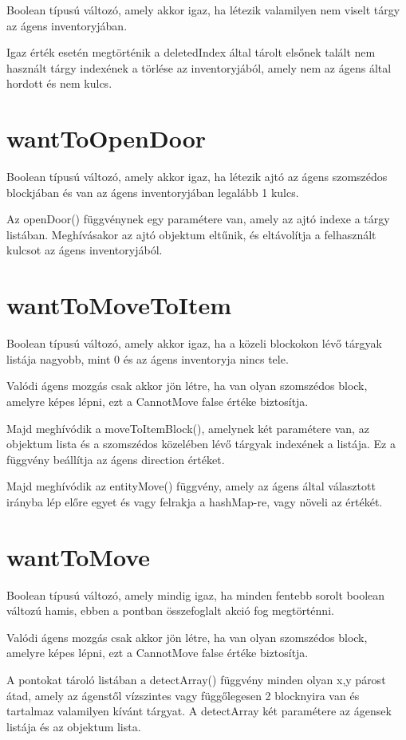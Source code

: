 Boolean típusú változó, amely akkor igaz, ha létezik valamilyen nem viselt tárgy az ágens inventoryjában.

Igaz érték esetén megtörténik a deletedIndex által tárolt elsőnek talált nem használt tárgy indexének a törlése az inventoryjából, 
amely nem az ágens által hordott és nem kulcs.

\section{wantToOpenDoor}

Boolean típusú változó, amely akkor igaz, ha létezik ajtó az ágens szomszédos blockjában és van az ágens inventoryjában legalább 1 kulcs.

Az openDoor() függvénynek egy paramétere van, amely az ajtó indexe a tárgy listában. Meghívásakor
az ajtó objektum eltűnik, és eltávolítja a felhasznált kulcsot az ágens inventoryjából.

\section{wantToMoveToItem}

Boolean típusú változó, amely akkor igaz, ha a közeli blockokon lévő tárgyak listája nagyobb, mint 0 és az ágens inventoryja nincs tele.

Valódi ágens mozgás csak akkor jön létre, ha van olyan szomszédos block, amelyre képes lépni, ezt a CannotMove false értéke biztosítja.

Majd meghívódik a moveToItemBlock(), amelynek két paramétere van, az objektum lista és a szomszédos közelében lévő tárgyak indexének a listája.
Ez a függvény beállítja az ágens direction értéket.

Majd meghívódik az entityMove() függvény, amely az ágens által választott irányba lép előre egyet és vagy felrakja a hashMap-re, vagy növeli az értékét.

\section{wantToMove}

Boolean típusú változó, amely mindig igaz, ha minden fentebb sorolt boolean változú hamis, ebben a pontban összefoglalt akció fog megtörténni.

Valódi ágens mozgás csak akkor jön létre, ha van olyan szomszédos block, amelyre képes lépni, ezt a CannotMove false értéke biztosítja.

A pontokat tároló listában a detectArray() függvény minden olyan x,y párost átad, amely az ágenstől vízszintes vagy függőlegesen 2 blocknyira van
és tartalmaz valamilyen kívánt tárgyat. A detectArray két paramétere az ágensek listája és az objektum lista.

